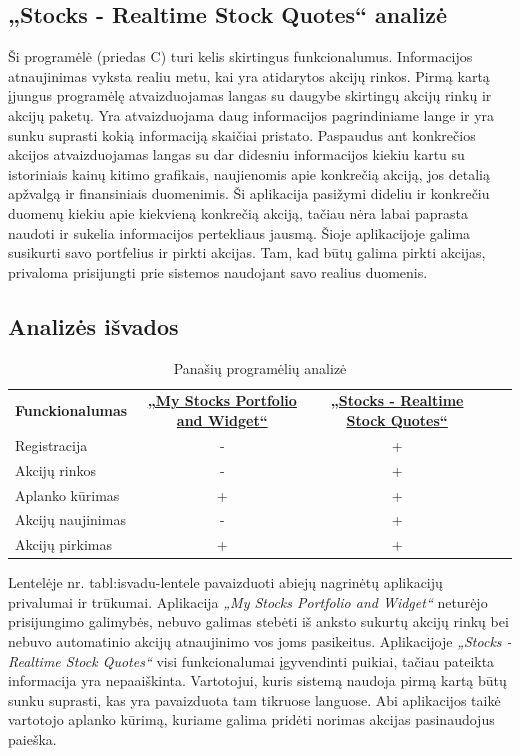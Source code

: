 \documentclass[a4paper,12pt,fleqn]{article}
\begin{document}
\subsection{„Stocks - Realtime Stock Quotes“ analizė}
Ši programėlė (priedas C) turi kelis skirtingus funkcionalumus.
Informacijos atnaujinimas vyksta realiu metu, kai yra atidarytos akcijų rinkos. Pirmą kartą įjungus programėlę atvaizduojamas langas su daugybe skirtingų akcijų rinkų ir akcijų paketų. Yra atvaizduojama daug informacijos pagrindiniame lange ir yra sunku suprasti kokią informaciją skaičiai pristato. Paspaudus ant konkrečios akcijos atvaizduojamas langas su dar didesniu informacijos kiekiu kartu su istoriniais kainų kitimo grafikais, naujienomis apie konkrečią akciją, jos detalią apžvalgą ir finansiniais duomenimis. Ši aplikacija pasižymi dideliu ir konkrečiu duomenų kiekiu apie kiekvieną konkrečią akciją, tačiau nėra labai paprasta naudoti ir sukelia informacijos pertekliaus jausmą. Šioje aplikacijoje galima susikurti savo portfelius ir pirkti akcijas. Tam, kad būtų galima pirkti akcijas, privaloma prisijungti prie sistemos naudojant savo realius duomenis.
\subsection{Analizės išvados}
\begin{table}[!ht]\centering
	\caption{Panašių programėlių analizė}
	\label{tabl:isvadu-lentele}
	\begin{tabular}{|l|c|c|ll}
		\cline{1-3}
		\textbf{Funckionalumas} & \textbf{\href{https://play.google.com/store/apps/details?id=co.peeksoft.stocks}{„My Stocks Portfolio and Widget“}} & \textbf{\href{https://play.google.com/store/apps/details?id=org.dayup.stocks}{„Stocks - Realtime Stock Quotes“}} &  \\ \cline{1-3}
		Registracija&-&+& \\ \cline{1-3}
		Akcijų rinkos&-&+& \\ \cline{1-3}
		Aplanko kūrimas&+&+& \\ \cline{1-3}
		Akcijų naujinimas&-&+& \\ \cline{1-3}
		Akcijų pirkimas&+&+& \\ \cline{1-3}
	\end{tabular}
\end{table}
Lentelėje nr. {tabl:isvadu-lentele} pavaizduoti abiejų nagrinėtų aplikacijų privalumai ir trūkumai. Aplikacija \textit{„My Stocks Portfolio and Widget“} neturėjo prisijungimo galimybės, nebuvo galimas stebėti iš anksto sukurtų akcijų rinkų bei nebuvo automatinio akcijų atnaujinimo vos joms pasikeitus. Aplikacijoje \textit{„Stocks - Realtime Stock Quotes“} visi funkcionalumai įgyvendinti puikiai, tačiau pateikta informacija yra nepaaiškinta. Vartotojui, kuris sistemą naudoja pirmą kartą būtų sunku suprasti, kas yra pavaizduota tam tikruose languose. Abi aplikacijos taikė vartotojo aplanko kūrimą, kuriame galima pridėti norimas akcijas pasinaudojus paieška.
 
\end{document}
